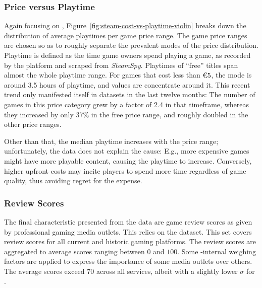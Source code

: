 \subsubsection{Price versus Playtime}
Again focusing on \steam,
Figure~\ref{fig:steam-cost-vs-playtime-violin} breaks down the
distribution of average playtimes per game price range. The game price
ranges are chosen so as to roughly separate the prevalent modes of the
price distribution.
Playtime is defined as the time game owners spend playing a game, as
recorded by the \steam platform and scraped from \textit{SteamSpy}.
Playtimes of ``free'' titles
span almost the whole playtime range.
For games that cost less than $\text{\texteuro} 5$, the mode is around
3.5 hours of playtime, and values are concentrate around it.
This recent trend only
manifested itself in datasets in the last twelve months:
The number of games in this price category grew by a factor of
2.4 in that timeframe,
whereas they
increased by only 37\% in the free price range, and roughly doubled
in the other price ranges.

Other than that, the median playtime increases with the price range;
unfortunately, the data does not explain the cause: E.g., more expensive
games might have more playable content, causing the playtime to
increase. Conversely, higher upfront costs may incite players to spend
more time regardless of game quality, thus avoiding regret for the
expense.


\subsubsection{Review Scores}

The final characteristic presented from the data are game review scores as
given by professional gaming media outlets. This relies on the
\metacritic dataset. This set covers review scores for all current
and historic gaming platforms. The review scores are aggregated to
average scores ranging between $0$ and $100$. Some \metacritic-internal
weighing factors are applied to express the importance of some media
outlets over others.
The average scores exceed 70 across all services, albeit with a
slightly lower $\sigma$ for \gfnow.



